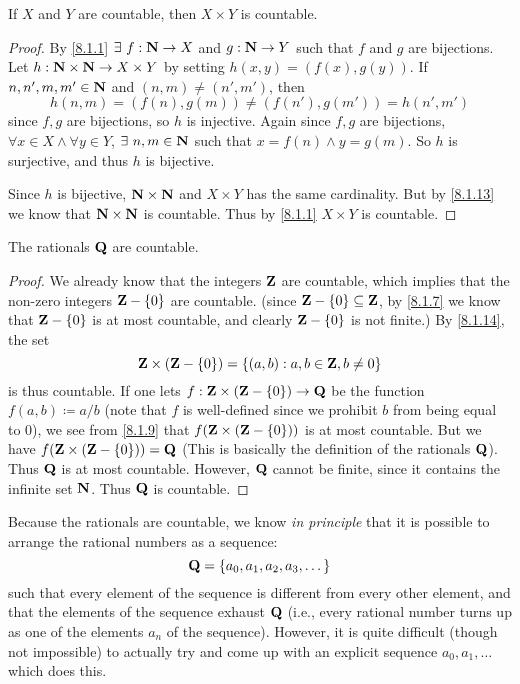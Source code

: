 \begin{corollary}\label{8.1.14}
  If \(X\) and \(Y\) are countable, then \(X \times Y\) is countable.
\end{corollary}

\begin{proof}
  By \cref{8.1.1} \(\exists\ f : \mathbf{N} \to X\) and \(g : \mathbf{N} \to Y\) such that \(f\) and \(g\) are bijections.
  Let \(h : \mathbf{N} \times \mathbf{N} \to X \times Y\) by setting \(h(x, y) = (f(x), g(y))\).
  If \(n, n', m, m' \in \mathbf{N}\) and \((n, m) \neq (n', m')\), then
  \[
    h(n, m) = (f(n), g(m)) \neq (f(n'), g(m')) = h(n', m')
  \]
  since \(f, g\) are bijections, so \(h\) is injective.
  Again since \(f, g\) are bijections, \(\forall x \in X \land \forall y \in Y\), \(\exists\ n, m \in \mathbf{N}\) such that \(x = f(n) \land y = g(m)\).
  So \(h\) is surjective, and thus \(h\) is bijective.

  Since \(h\) is bijective, \(\mathbf{N} \times \mathbf{N}\) and \(X \times Y\) has the same cardinality.
  But by \cref{8.1.13} we know that \(\mathbf{N} \times \mathbf{N}\) is countable.
  Thus by \cref{8.1.1} \(X \times Y\) is countable.
\end{proof}

\begin{corollary}\label{8.1.15}
  The rationals \(\mathbf{Q}\) are countable.
\end{corollary}

\begin{proof}
  We already know that the integers \(\mathbf{Z}\) are countable, which implies that the non-zero integers \(\mathbf{Z} - \{0\}\) are countable.
  (since \(\mathbf{Z} - \{0\} \subseteq \mathbf{Z}\), by \cref{8.1.7} we know that \(\mathbf{Z} - \{0\}\) is at most countable, and clearly \(\mathbf{Z} - \{0\}\) is not finite.)
  By \cref{8.1.14}, the set
  \[
    \mathbf{Z} \times (\mathbf{Z} - \{0\}) = \{(a, b) : a, b \in \mathbf{Z}, b \neq 0\}
  \]
  is thus countable.
  If one lets \(f : \mathbf{Z} \times (\mathbf{Z} - \{0\}) \to \mathbf{Q}\) be the function \(f(a, b) \coloneqq a / b\)
  (note that \(f\) is well-defined since we prohibit \(b\) from being equal to \(0\)), we see from \cref{8.1.9} that \(f(\mathbf{Z} \times (\mathbf{Z} - \{0\}))\) is at most countable.
  But we have \(f(\mathbf{Z} \times (\mathbf{Z} - \{0\})) = \mathbf{Q}\)
  (This is basically the definition of the rationals \(\mathbf{Q}\)).
  Thus \(\mathbf{Q}\) is at most countable.
  However, \(\mathbf{Q}\) cannot be finite, since it contains the infinite set \(\mathbf{N}\).
  Thus \(\mathbf{Q}\) is countable.
\end{proof}

\begin{remark}\label{8.1.16}
  Because the rationals are countable, we know \emph{in principle} that it is possible to arrange the rational numbers as a sequence:
  \[
    \mathbf{Q} = \{a_0, a_1, a_2, a_3, \dots\}
  \]
  such that every element of the sequence is different from every other element, and that the elements of the sequence exhaust \(\mathbf{Q}\)
  (i.e., every rational number turns up as one of the elements \(a_n\) of the sequence).
  However, it is quite difficult (though not impossible) to actually try and come up with an explicit sequence \(a_0, a_1, \dots\) which does this.
\end{remark}

